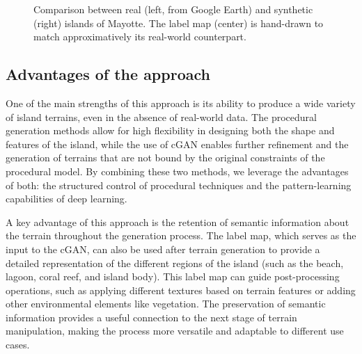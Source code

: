 \begin{figure}
    \caption{Comparison between real (left, from Google Earth) and synthetic (right) islands of Mayotte. The label map (center) is hand-drawn to match approximatively its real-world counterpart. }
    \label{fig:coral-island-example-Mayotte}
\end{figure}








\subsection{Advantages of the approach}
\label{sec:coral-island-advantages}

One of the main strengths of this approach is its ability to produce a wide variety of island terrains, even in the absence of real-world data. The procedural generation methods allow for high flexibility in designing both the shape and features of the island, while the use of cGAN enables further refinement and the generation of terrains that are not bound by the original constraints of the procedural model. By combining these two methods, we leverage the advantages of both: the structured control of procedural techniques and the pattern-learning capabilities of deep learning.

A key advantage of this approach is the retention of semantic information about the terrain throughout the generation process. The label map, which serves as the input to the cGAN, can also be used after terrain generation to provide a detailed representation of the different regions of the island (such as the beach, lagoon, coral reef, and island body). This label map can guide post-processing operations, such as applying different textures based on terrain features or adding other environmental elements like vegetation. The preservation of semantic information provides a useful connection to the next stage of terrain manipulation, making the process more versatile and adaptable to different use cases.

